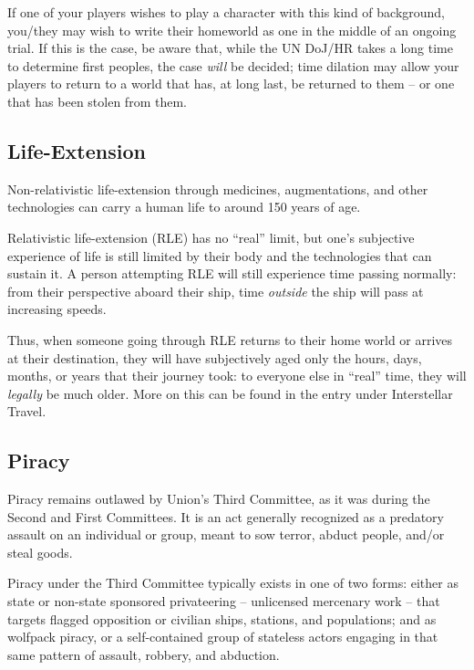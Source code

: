 If one of your players wishes to play a character with this kind of background, you/they may wish
to write their homeworld as one in the middle of an ongoing trial. If this is the case, be aware
that, while the UN DoJ/HR takes a long time to determine first peoples, the case \textit{will} be decided;
time dilation may allow your players to return to a world that has, at long last, be returned to
them -- or one that has been stolen from them.

\subsection{Life-Extension}

Non-relativistic life-extension through medicines, augmentations, and other technologies can
carry a human life to around 150 years of age.

Relativistic life-extension (RLE) has no ``real'' limit, but one's subjective experience of life is still
limited by their body and the technologies that can sustain it. A person attempting RLE will still
experience time passing normally: from their perspective aboard their ship, time \textit{outside} the ship
will pass at increasing speeds.

Thus, when someone going through RLE returns to their home world or arrives at their
destination, they will have subjectively aged only the hours, days, months, or years that their
journey took: to everyone else in ``real'' time, they will \textit{legally} be much older. More on this can be
found in the entry under Interstellar Travel.

\subsection{Piracy}

Piracy remains outlawed by Union's Third Committee, as it was during the Second and First
Committees. It is an act generally recognized as a predatory assault on an individual or group,
meant to sow terror, abduct people, and/or steal goods.

Piracy under the Third Committee typically exists in one of two forms: either as state or non-state
sponsored privateering -- unlicensed mercenary work -- that targets flagged opposition or
civilian ships, stations, and populations; and as wolfpack piracy, or a self-contained group of
stateless actors engaging in that same pattern of assault, robbery, and abduction.

